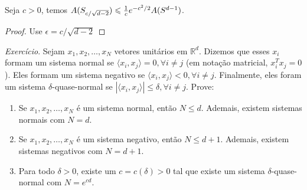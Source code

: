 \begin{lema}
Seja $c > 0$, temos $A(S_{c/\sqrt{d-2}}) \leqslant {1 \over c} e^{-c^2/2} A(S^{d-1})$.
\end{lema}

\begin{proof}
Use $\epsilon = c/\sqrt{d-2}$
\end{proof}

\textit{Exercício}. Sejam $x_1, x_2, \dots, x_N$ vetores unitários em $\mathbb{R}^d$. Dizemos que esses $x_i$ formam um sistema normal se $\langle x_i, x_j \rangle = 0, \forall i \not = j$ (em notação matricial, $x_i^Tx_j = 0$). Eles formam um sistema negativo se $\langle x_i, x_j \rangle < 0, \forall i \not = j$. Finalmente, eles foram um sistema $\delta$-quase-normal se $| \langle x_i, x_j \rangle | \leqslant \delta, \forall i \not = j$. Prove:

\begin{enumerate}
\item Se $x_1, x_2, \dots, x_N$ é um sistema normal, então $N \leqslant d$. Ademais, existem sistemas normais com $N = d$.
\item Se $x_1, x_2, \dots, x_N$ é um sistema negativo, então $N \leqslant d+1$. Ademais, existem sistemas negativos com $N = d+1$.
\item Para todo $\delta > 0$, existe um $c = c(\delta) > 0$ tal que existe um sistema $\delta$-quase-normal com $N = e^{cd}$.
\end{enumerate}

